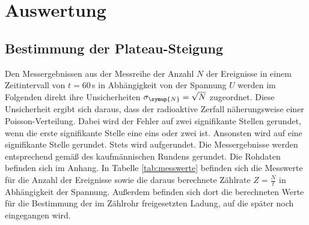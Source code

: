 \section{Auswertung}
\label{sec:Auswertung}

\subsection{Bestimmung der Plateau-Steigung}
\label{subsec:plateau}

Den Messergebnissen aus der Messreihe der Anzahl $N$ der Ereignisse in einem Zeitintervall
von $t=60\,$s in Abhängigkeit von der Spannung $U$ werden im Folgenden direkt ihre
Unsicherheiten $\sigma_{\symup{N}}=\sqrt{N}$ zugeordnet. Diese Unsicherheit ergibt
sich daraus, dass der radioaktive Zerfall näherungsweise einer Poisson-Verteilung.
Dabei wird der Fehler auf zwei signifikante Stellen gerundet, wenn die
erste signifikante Stelle eine eins oder zwei ist. Ansonsten wird auf eine signifikante
Stelle gerundet. Stets wird aufgerundet. Die Messergebnisse werden entsprechend
gemäß des kaufmännischen Rundens gerundet. Die Rohdaten befinden sich im Anhang.
In Tabelle \ref{tab:messwerte} befinden sich die Messwerte für die Anzahl der
Ereignisse sowie die daraus berechnete Zählrate $Z=\frac{N}{t}$ in Abhängigkeit
der Spannung. Außerdem befinden sich dort die berechneten Werte für die Bestimmung
der im Zählrohr freigesetzten Ladung, auf die später noch eingegangen
wird.

